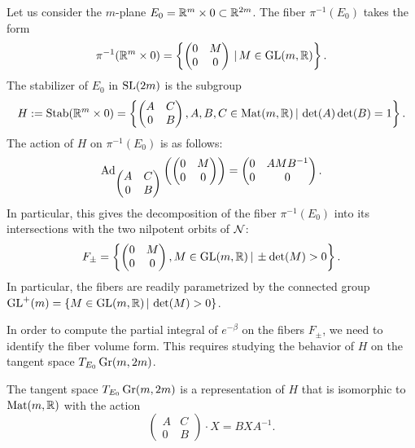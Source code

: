 \documentclass[english]{article}
\begin{document}
Let us consider the $m$-plane $E_0 = \mathbb{R}^m \times 0 \subset \mathbb{R}^{2m}$. The fiber $\pi^{-1}(E_0)$ takes the form
\[
	\pi^{-1}(\mathbb{R}^m \times 0) = 
		\left\{
		\begin{pmatrix}
			0 & M\\
			0 & 0
		\end{pmatrix}
		\, | \,
		M \in \operatorname{GL}(m, \mathbb{R})
		\right\}
.\]
%
The stabilizer of $E_0$ in $\operatorname{SL}(2m)$ is the subgroup
\[
	H:=
	\operatorname{Stab}(\mathbb{R}^m \times 0) 
	= \left\{
		\begin{pmatrix}
			A & C\\
			0 & B
		\end{pmatrix}, 
		A, B, C \in \operatorname{Mat}(m, \mathbb{R})
		\, | \,
		\det(A)\det(B) = 1
	\right\}
.\]
The action of $H$ on $\pi^{-1}(E_0)$ is as follows:
\begin{equation}\label{eqno:ActionHfiber}
	\operatorname{Ad}_{\begin{pmatrix}
				A & C\\
				0 & B
			\end{pmatrix}}
	\left(
		\begin{pmatrix}
				0 & M\\
				0 & 0
			\end{pmatrix}
	\right)
	=
		\begin{pmatrix}
				0 & AMB^{-1}\\
				0 & 0
			\end{pmatrix}
.\end{equation}
In particular, this gives the decomposition of the fiber $\pi^{-1}(E_0)$ into its intersections with the two nilpotent orbits of $\mathcal{N}$:
\begin{equation*}
	F_{\pm} = 
		\left\{
		\begin{pmatrix}
			0 & M\\
			0 & 0
		\end{pmatrix}
		, M \in \operatorname{GL}(m, \mathbb{R})
		\, | \,
		 \pm \det(M) > 0
		\right\}
.
\end{equation*}
In particular, the fibers are readily parametrized by the connected group $\operatorname{GL}^+(m) = \{M\in \operatorname{GL}(m, \mathbb{R}) \, |\, \det(M) > 0\}$.

In order to compute the partial integral of $e^{-\beta}$ on the fibers $F_{\pm}$, we need to identify the fiber volume form. This requires studying the behavior of $H$ on the tangent space $T_{E_0} \operatorname{Gr}(m,2m)$.

\begin{lemma}\label{lmno:TangentGrass}
	The tangent space $T_{E_0} \operatorname{Gr}(m,2m)$ is a representation of $H$ that is isomorphic to $\operatorname{Mat}(m, \mathbb{R})$ with the action
	\[
		\begin{pmatrix}
						A & C\\
						0 & B
					\end{pmatrix}
		\cdot
		X
			=
		B X A^{-1}
.	\]
\end{lemma}
\end{document}
